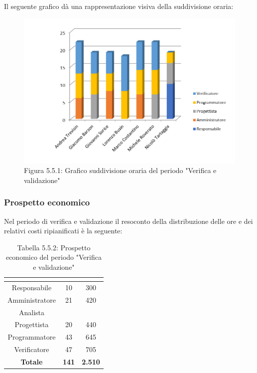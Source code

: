 Il seguente grafico dà una rappresentazione visiva della suddivisione oraria: \\
\begin{figure} [H]
	\centering
	\includegraphics[scale=1]{Res/ExcelGrafici/Grafici/RipianificazioneOre.png}
	\caption{Figura 5.5.1: Grafico suddivisione oraria del periodo "Verifica e validazione"}\label{}
\end{figure}


\subsubsection{Prospetto economico}
Nel periodo di verifica e validazione il resoconto della distribuzione delle ore e dei relativi costi ripianificati è la seguente:

\renewcommand{\arraystretch}{1.5}
\begin{table}[H]
\begin{center}
\begin{tabular}{|c|c|c|}
\hline
\rowcolor{title_row}
\textbf{\color{title_text}{Ruolo}}  & \textbf{\color{title_text}{Ore}} & \textbf{\color{title_text}{Costo in \euro}} \\ \hline
Responsabile    & 10 & 300 \\ \hline
Amministratore  & 21 & 420 \\ \hline
Analista        & & \\ \hline
Progettista     & 20 & 440 \\ \hline
Programmatore   & 43 & 645 \\ \hline
Verificatore    & 47 & 705 \\ \hline
\textbf{Totale} & \textbf{141}    & \textbf{2.510}           \\ \hline
\end{tabular}
\caption{Tabella 5.5.2: Prospetto economico del periodo "Verifica e validazione"\label{}}
\end{center}
\end{table}
\renewcommand{\arraystretch}{1}

